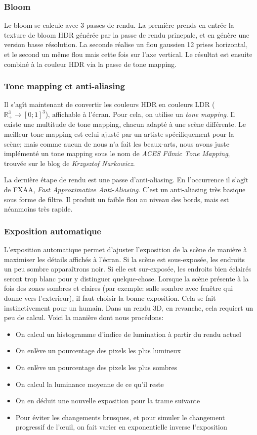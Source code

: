 \documentclass[a4paper,12pt]{article}
\begin{document}
\subsubsection{Bloom}
Le bloom se calcule avec 3 passes de rendu. La première prends en entrée la texture de bloom HDR générée par la passe de rendu princpale,
et en génère une version basse résolution. La seconde réalise un flou gaussien 12 prises horizontal, et le second un même flou mais cette
fois sur l'axe vertical. Le résultat est ensuite combiné à la couleur HDR via la passe de tone mapping.

\subsubsection{Tone mapping et anti-aliasing}
Il s'agît maintenant de convertir les couleurs HDR en couleurs LDR ($\mathbb{R}_+^3 \to [0; 1]^3$), affichable à l'écran.
Pour cela, on utilise un \emph{tone mapping}. Il existe une multitude de tone mapping, chacun adapté à une scène différente.
Le meilleur tone mapping est celui ajusté par un artiste spécifiquement pour la scène; mais comme aucun de nous n'a fait les
beaux-arts, nous avons juste implémenté un tone mapping sous le nom de \emph{ACES Filmic Tone Mapping}, trouvée sur le blog de \emph{Krzysztof Narkowicz}.

La dernière étape de rendu est une passe d'anti-aliasing. En l'occurrence il s'agît de FXAA, \emph{Fast Approximative Anti-Aliasing}.
C'est un anti-aliasing très basique sous forme de filtre. Il produit un faible flou au niveau des bords, mais est néanmoins très rapide.

\subsubsection{Exposition automatique}
L'exposition automatique permet d'ajuster l'exposition de la scène de manière à maximiser les détails affichés à l'écran. Si la scène
est sous-exposée, les endroits un peu sombre apparaîtrons noir. Si elle est sur-exposée, les endroits bien éclairés seront trop blanc
pour y distinguer quelque-chose. Lorsque la scène présente à la fois des zones sombres et claires (par exemple: salle sombre avec fenêtre
qui donne vers l'exterieur), il faut choisir la bonne exposition. Cela se fait instinctivement pour un humain. Dans un rendu 3D, en revanche,
cela requiert un peu de calcul. Voici la manière dont nous procédons:
\begin{itemize}
    \item On calcul un histogramme d'indice de lumination à partir du rendu actuel
    \item On enlève un pourcentage des pixels les plus lumineux
    \item On enlève un pourcentage des pixels les plus sombres
    \item On calcul la luminance moyenne de ce qu'il reste
    \item On en déduit une nouvelle exposition pour la trame suivante
    \item Pour éviter les changements brusques, et pour simuler le changement progressif de l'œuil, on fait varier en exponentielle inverse l'exposition
\end{itemize}
\end{document}
